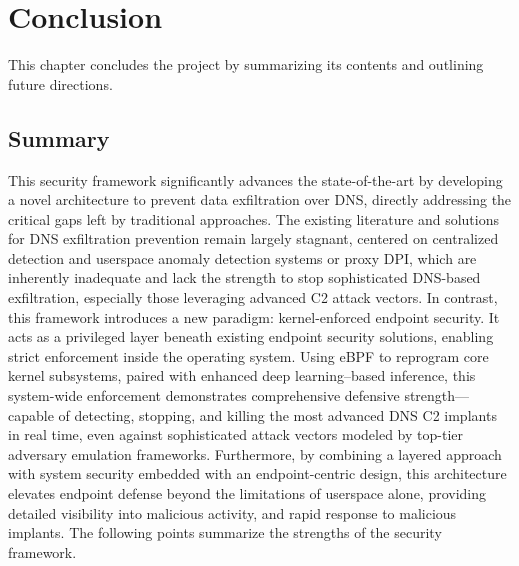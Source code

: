 \documentclass [11pt, proquest] {uwthesis}[2020/02/24]
\begin{document}


    

\chapter{Conclusion}
This chapter concludes the project by summarizing its contents and outlining future directions.

\section{Summary}
This security framework significantly advances the state-of-the-art by developing a novel architecture to prevent data exfiltration over DNS, directly addressing the critical gaps left by traditional approaches. The existing literature and solutions for DNS exfiltration prevention remain largely stagnant, centered on centralized detection and userspace anomaly detection systems or proxy DPI, which are inherently inadequate and lack the strength to stop sophisticated DNS-based exfiltration, especially those leveraging advanced C2 attack vectors. In contrast, this framework introduces a new paradigm: kernel-enforced endpoint security. It acts as a privileged layer beneath existing endpoint security solutions, enabling strict enforcement inside the operating system. Using eBPF to reprogram core kernel subsystems, paired with enhanced deep learning–based inference, this system-wide enforcement demonstrates comprehensive defensive strength—capable of detecting, stopping, and killing the most advanced DNS C2 implants in real time, even against sophisticated attack vectors modeled by top-tier adversary emulation frameworks.
Furthermore, by combining a layered approach with system security embedded with an endpoint-centric design, this architecture elevates endpoint defense beyond the limitations of userspace alone, providing detailed visibility into malicious activity, and rapid response to malicious implants. The following points summarize the strengths of the security framework.
\end{document}
